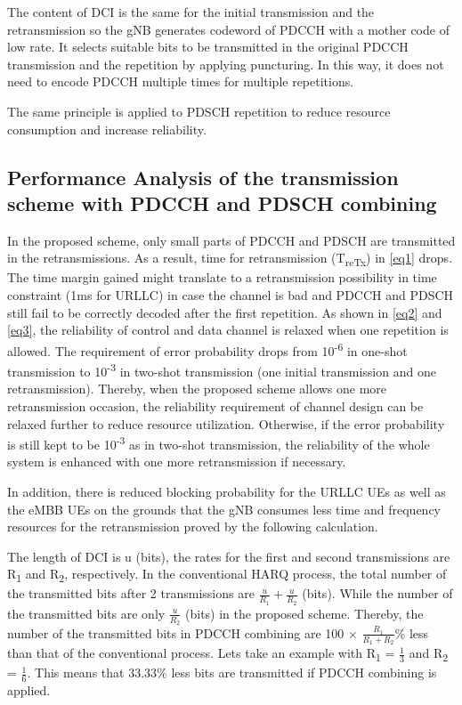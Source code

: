 \documentclass[conference]{IEEEtran}
\begin{document}
The content of DCI is the same for the initial transmission and the retransmission so the gNB generates codeword of PDCCH with a mother code of low rate. It selects suitable bits to be transmitted in the original PDCCH transmission and the repetition by applying puncturing. In this way, it does not need to encode PDCCH multiple times for multiple repetitions. 

The same principle is applied to PDSCH repetition to reduce resource consumption and increase reliability.

\subsection{Performance Analysis of the transmission scheme with PDCCH and PDSCH combining}\label{CC}

In the proposed scheme, only small parts of PDCCH and PDSCH are transmitted in the retransmissions. As a result, time for retransmission (T\textsubscript{reTx}) in \eqref{eq1} drops. The time margin gained might translate to a retransmission possibility in time constraint (1ms for URLLC) in case the channel is bad and PDCCH and PDSCH still fail to be correctly decoded after the first repetition. As shown in \eqref{eq2} and \eqref{eq3}, the reliability of control and data channel is relaxed when one repetition is allowed. The requirement of error probability drops from 10\textsuperscript{-6} in one-shot transmission to 10\textsuperscript{-3} in two-shot transmission (one initial transmission and one retransmission). Thereby, when the proposed scheme allows one more retransmission occasion, the reliability requirement of channel design can be relaxed further to reduce resource utilization. Otherwise, if the error probability is still kept to be 10\textsuperscript{-3} as in two-shot transmission, the reliability of the whole system is enhanced with one more retransmission if necessary. 

In addition, there is reduced blocking probability for the URLLC UEs as well as the eMBB UEs on the grounds that the gNB consumes less time and frequency resources for the retransmission proved by the following calculation. 

The length of DCI is u (bits), the rates for the first and second transmissions are R\textsubscript{1} and R\textsubscript{2}, respectively. In the conventional HARQ process, the total number of the transmitted bits after 2 transmissions are $\frac{u}{R_{1}} + \frac{u}{R_{2}}$ (bits). While the number of the transmitted bits are only $\frac{u}{R_{2}}$ (bits) in the proposed scheme. Thereby, the number of the transmitted bits in PDCCH combining are 100 $\times$ $\frac{R_{1}}{R_{1} + R_{2}}$\% less than that of the conventional process. Let\textquotesingle s take an example with R\textsubscript{1} = $\frac{1}{3}$ and R\textsubscript{2} = $\frac{1}{6}$. This means that 33.33\% less bits are transmitted if PDCCH combining is applied.
\end{document}
